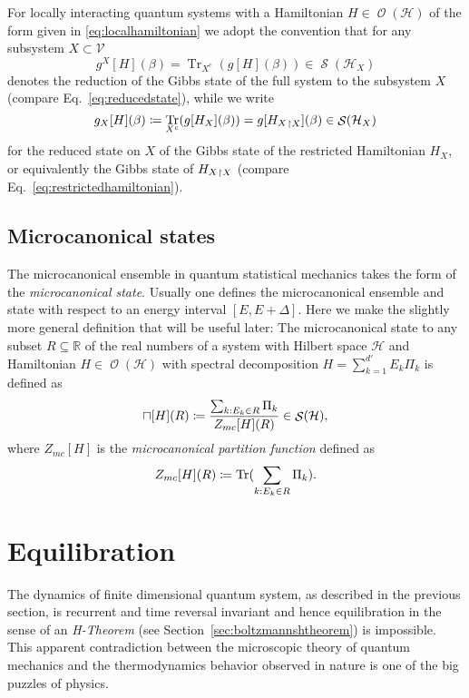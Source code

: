\documentclass[a4paper,12pt,listof=totoc,index=totoc,bibliography=totoc,headsepline=false,headings=normal,BCOR16.153846mm,DIV12,headinclude,twoside,cleardoublepage=empty,numbers=noenddot,final]{scrreprt}
\theoremstyle{mystyle}
\numberwithin{equation}{section}
\numberwithin{figure}{section}
\numberwithin{lemma}{section}
\numberwithin{theorem}{section}
\numberwithin{corollary}{section}
\numberwithin{definition}{section}
\numberwithin{conjecture}{section}
\numberwithin{observation}{section}
\newcommand{\+}{\mkern2mu}
\newcommand{\coloneqq}{\mathrel{\vcentcolon\mkern-1.2mu=}} %
\newcommand{\texteqref}[1]{Eq.~\eqref{#1}}
\renewcommand{\H}{H}
\newcommand{\rhog}{g}
\newcommand{\rhomc}{{\sqcap}}
\newcommand{\Vset}{\mathcal{V}}
\newcommand{\compl}[1]{{{#1}^c}}
\newcommand{\trunc}[2]{{#1}_{\upharpoonright \mathnormal{#2}}}
\DeclareMathOperator{\1}{\mathds{1}}
\DeclareMathOperator{\Obs}{\mathcal{O}}
\DeclareMathOperator{\Qst}{\mathcal{S}}
\DeclareMathOperator{\Tr}{Tr}
\newcommand{\mc}[1]{\mathcal{#1}}
\newcommand{\mcH}{\mc{H}}
\newcommand{\mb}[1]{\mathbb{#1}}
\newcommand{\R}{\mb{R}}
\begin{document}
For locally interacting quantum systems with a Hamiltonian $\H \in \Obs(\mcH)$ of the form given in \eqref{eq:localhamiltonian} we adopt the convention that for any subsystem $X \subset \Vset$
\begin{equation}
  \rhog^X[\H](\beta) = \Tr_{\compl{X}}(\rhog[\H](\beta)) \in \Qst(\mcH_X)
\end{equation}
denotes the reduction of the Gibbs state of the full system to the subsystem $X$ (compare \texteqref{eq:reducedstate}), while we write
\begin{equation}
  \rhog_X[\H](\beta) \coloneqq \Tr_{\compl{X}}(\rhog[\H_X](\beta)) = \rhog[\trunc{\H_X} X](\beta) \in \Qst(\mcH_X)
\end{equation}
for the reduced state on $X$ of the Gibbs state of the restricted Hamiltonian $\H_X$, or equivalently the Gibbs state of $\trunc{\H_X} X$  (compare \texteqref{eq:restrictedhamiltonian}).


\subsection{Microcanonical states}
\label{sec:microcanonicalstates}
%
The microcanonical ensemble in quantum statistical mechanics takes the form of the \emph{microcanonical state}.
Usually one defines the microcanonical ensemble and state with respect to an energy interval $[E,E+\Delta]$.
Here we make the slightly more general definition that will be useful later:
The microcanonical state to any subset $R \subseteq \R$ of the real numbers of a system with Hilbert space $\mcH$ and Hamiltonian $\H \in \Obs(\mcH)$ with spectral decomposition $\H = \sum_{k=1}^{d'} E_k \Pi_k$ is defined as
\begin{equation}
  \rhomc[\H](R) \coloneqq \frac{\sum_{k:E_k \in R} \Pi_k}{Z_{mc}[\H](R)} \in \Qst(\mcH) ,
\end{equation}
where $Z_{mc}[\H]$ is the \emph{microcanonical partition function} defined as
\begin{equation}
  Z_{mc}[\H](R) \coloneqq \Tr(\sum_{k:E_k \in R} \Pi_k) .
\end{equation}


\section{Equilibration}
\label{sec:equilibration}
%
The dynamics of finite dimensional quantum system, as described in the previous section, is recurrent \cite{JChemPhys843,Schulman1978,PhysRevLett.49,PhysRev.107.33,Wallace2013} and time reversal invariant and hence equilibration in the sense of an \emph{H-Theorem} \cite{RevModPhys.27.289} (see Section~\ref{sec:boltzmannshtheorem}) is impossible.
This apparent contradiction between the microscopic theory of quantum mechanics and the thermodynamics behavior observed in nature is one of the big puzzles of physics.
\end{document}
